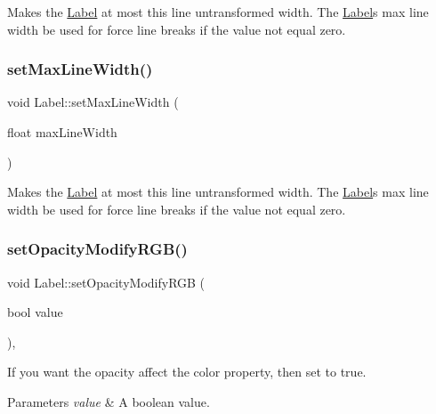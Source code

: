 Makes the \hyperlink{classLabel}{Label} at most this line untransformed width. The \hyperlink{classLabel}{Label}\textquotesingle{}s max line width be used for force line breaks if the value not equal zero. \mbox{\label{classLabel_ad7bd1d7f371a961f4c03c36ee31357b6}} 
\subsubsection{\texorpdfstring{set\+Max\+Line\+Width()}{setMaxLineWidth()}\hspace{0.1cm}{\footnotesize\ttfamily [2/2]}}
{\footnotesize\ttfamily void Label\+::set\+Max\+Line\+Width (\begin{DoxyParamCaption}\item[{float}]{max\+Line\+Width }\end{DoxyParamCaption})}

Makes the \hyperlink{classLabel}{Label} at most this line untransformed width. The \hyperlink{classLabel}{Label}\textquotesingle{}s max line width be used for force line breaks if the value not equal zero. \mbox{\label{classLabel_ab548565b1faa8449ced97d96a591e955}} 
\subsubsection{\texorpdfstring{set\+Opacity\+Modify\+R\+G\+B()}{setOpacityModifyRGB()}\hspace{0.1cm}{\footnotesize\ttfamily [1/2]}}
{\footnotesize\ttfamily void Label\+::set\+Opacity\+Modify\+R\+GB (\begin{DoxyParamCaption}\item[{bool}]{value }\end{DoxyParamCaption})\hspace{0.3cm}{\ttfamily [override]}, {\ttfamily [virtual]}}

If you want the opacity affect the color property, then set to true. 
\begin{DoxyParams}{Parameters}
{\em value} & A boolean value. \\
\hline
\end{DoxyParams}


